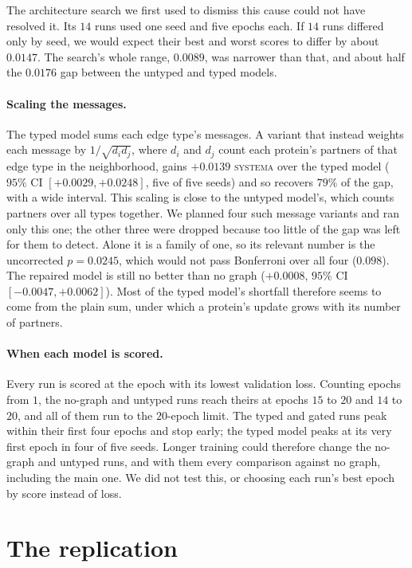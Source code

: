 \documentclass{article}
\begin{document}
The architecture search we first used to dismiss this cause could not have resolved it. Its $14$ runs used
one seed and five epochs each. If $14$ runs differed only by seed, we would expect their best and worst
scores to differ by about $0.0147$. The search's whole range, $0.0089$, was narrower than that, and about
half the $0.0176$ gap between the untyped and typed models.

\paragraph{Scaling the messages.} The typed model sums each edge type's messages. A variant that instead
weights each message by $1/\sqrt{d_i d_j}$, where $d_i$ and $d_j$ count each protein's partners of that
edge type in the neighborhood, gains $+0.0139$ \textsc{systema} over the typed model ($95\%$ CI
$[+0.0029,+0.0248]$, five of five seeds) and so recovers $79\%$ of the gap, with a wide interval. This
scaling is close to the untyped model's, which counts partners over all types together. We planned four
such message variants and ran only this one; the other three were dropped because too little of the gap
was left for them to detect. Alone it is a family of one, so its relevant number is the uncorrected
$p{=}0.0245$, which would not pass Bonferroni over all four ($0.098$). The repaired
model is still no better than no graph ($+0.0008$, $95\%$ CI $[-0.0047,+0.0062]$). Most of the typed
model's shortfall therefore seems to come from the plain sum, under which a protein's update grows with
its number of partners.

\paragraph{When each model is scored.} Every run is scored at the epoch with its lowest validation loss.
Counting epochs from $1$, the no-graph and untyped runs reach theirs at epochs $15$ to $20$ and $14$ to
$20$, and all of them run to the $20$-epoch limit. The typed and gated runs peak within their first four
epochs and stop early; the typed model peaks at its very first epoch in four of five seeds. Longer
training could therefore change the no-graph and untyped runs, and with them every comparison against no
graph, including the main one. We did not test this, or choosing each run's best epoch by score instead of
loss.

\section{The replication}
\label{app:repl}
\end{document}
